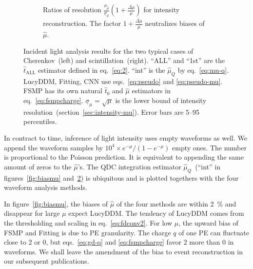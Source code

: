 \begin{figure}[H]
  \vspace{0.5em}
  \begin{subfigure}[b]{\textwidth}
    \centering
    \resizebox{\textwidth}{!}{}
    \caption{\label{fig:deltamu} Ratios of resolution $\frac{\sigma_{\hat{\mu}}}{\underline{\sigma}_\mu}\left(1 + \frac{\overline{\Delta \mu}}{\mu}\right)$ for intensity reconstruction.  The factor $1 + \frac{\overline{\Delta \mu}}{\mu}$ neutralizes biases of $\hat{\mu}$.}
  \end{subfigure}
  \caption{Incident light analysis results for the two typical cases of Cherenkov~(left) and scintillation~(right).  ``ALL'' and ``1st'' are the $\hat{t}_\mathrm{ALL}$ estimator defined in eq.~\eqref{eq:2}. ``int'' is the $\hat{\mu}_Q$ by eq.~\eqref{eq:mu-q}.  LucyDDM, Fitting, CNN use eqs.~\eqref{eq:pseudo} and \eqref{eq:pseudo-mu}.  FSMP has its own natural $\hat{t}_0$ and $\hat{\mu}$ estimators in eq.~\eqref{eq:fsmpcharge}. $\underline{\sigma}_\mu = \sqrt{\mu}$ is the lower bound of intensity resolution~(section~\ref{sec:intensity-mu}). Error bars are 5--95 percentiles.}
\end{figure}

In contract to time, inference of light intensity uses empty waveforms as well.  We append the waveform samples by $10^4 \times e^{-\mu} / (1-e^{-\mu})$ empty ones.  The number is proportional to the Poisson prediction.  It is equivalent to appending the same amount of zeros to the $\hat{\mu}$'s. The QDC integration estimator $\hat{\mu}_Q$~(``int'' in figures~\ref{fig:biasmu} and~\ref{fig:deltamu}) is ubiquitous and is plotted togethers with the four waveform analysis methods.

In figure~\ref{fig:biasmu}, the biases of $\hat{\mu}$ of the four methods are within \SI{2}{\percent} and disappear for large $\mu$ expect LucyDDM.  The tendency of LucyDDM comes from the thresholding and scaling in eq.~\eqref{eq:fdconv2}.  For low $\mu$, the upward bias of FSMP and Fitting is due to PE granularity.  The charge $q$ of one PE can fluctuate close to 2 or 0, but eqs.~\eqref{eq:gd-q} and \eqref{eq:fsmpcharge} favor 2 more than 0 in waveforms.  We shall leave the amendment of the bias to event reconstruction in our subsequent publications.

